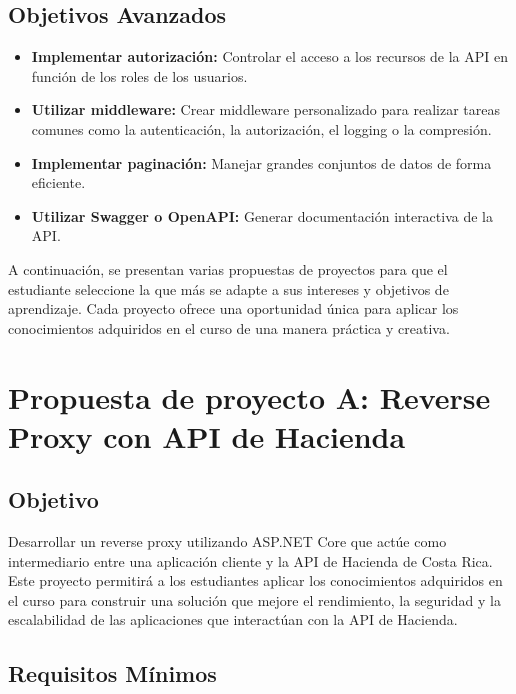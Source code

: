 \documentclass[
]{agujournal2019}
\providecommand{\tightlist}{%
  \setlength{\itemsep}{0pt}\setlength{\parskip}{0pt}}\usepackage{longtable,booktabs,array}
\begin{document}
\subsection{Objetivos Avanzados}\label{objetivos-avanzados}

\begin{itemize}
\tightlist
\item
  \textbf{Implementar autorización:} Controlar el acceso a los recursos
  de la API en función de los roles de los usuarios.
\item
  \textbf{Utilizar middleware:} Crear middleware personalizado para
  realizar tareas comunes como la autenticación, la autorización, el
  logging o la compresión.
\item
  \textbf{Implementar paginación:} Manejar grandes conjuntos de datos de
  forma eficiente.
\item
  \textbf{Utilizar Swagger o OpenAPI:} Generar documentación interactiva
  de la API.
\end{itemize}

A continuación, se presentan varias propuestas de proyectos para que el
estudiante seleccione la que más se adapte a sus intereses y objetivos
de aprendizaje. Cada proyecto ofrece una oportunidad única para aplicar
los conocimientos adquiridos en el curso de una manera práctica y
creativa.

\section{Propuesta de proyecto A: Reverse Proxy con API de
Hacienda}\label{propuesta-de-proyecto-a-reverse-proxy-con-api-de-hacienda}

\subsection{Objetivo}\label{objetivo}

Desarrollar un reverse proxy utilizando ASP.NET Core que actúe como
intermediario entre una aplicación cliente y la API de Hacienda de Costa
Rica. Este proyecto permitirá a los estudiantes aplicar los
conocimientos adquiridos en el curso para construir una solución que
mejore el rendimiento, la seguridad y la escalabilidad de las
aplicaciones que interactúan con la API de Hacienda.

\subsection{Requisitos Mínimos}\label{requisitos-muxednimos}
\end{document}
